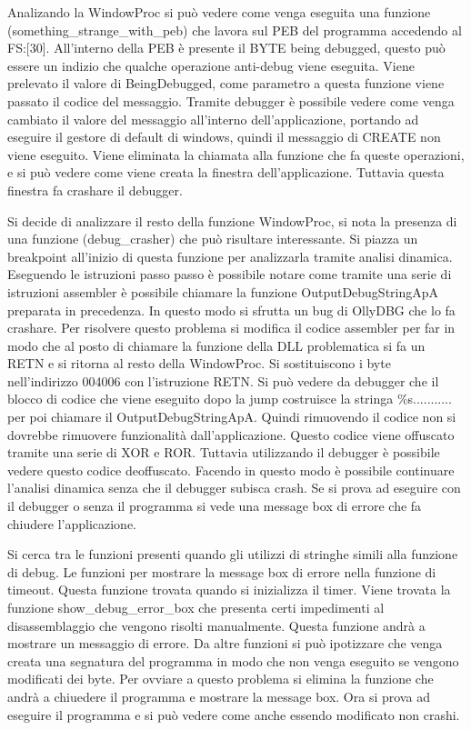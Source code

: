 \documentclass[a4paper,10pt]{article}
\begin{document}
Analizando la WindowProc si può vedere come venga eseguita una funzione (something\_strange\_with\_peb) che lavora sul PEB del programma accedendo al FS:[30]. All'interno della PEB è presente il BYTE being debugged, questo può essere un indizio che qualche operazione anti-debug viene eseguita. Viene prelevato il valore di BeingDebugged, come parametro a questa funzione viene passato il codice del messaggio. Tramite debugger è possibile vedere come venga cambiato il valore del messaggio all'interno dell'applicazione, portando ad eseguire il gestore di default di windows, quindi il messaggio di CREATE non viene eseguito. Viene eliminata la chiamata alla funzione che fa queste operazioni, e si può vedere come viene creata la finestra dell'applicazione. Tuttavia questa finestra fa crashare il debugger.

Si decide di analizzare il resto della funzione WindowProc, si nota la presenza di una funzione (debug\_crasher) che può risultare interessante. Si piazza un breakpoint all'inizio di questa funzione per analizzarla tramite analisi dinamica. Eseguendo le istruzioni passo passo è possibile notare come tramite una serie di istruzioni assembler è possibile chiamare la funzione OutputDebugStringApA preparata in precedenza. In questo modo si sfrutta un bug di OllyDBG che lo fa crashare. Per risolvere questo problema si modifica il codice assembler per far in modo che al posto di chiamare la funzione della DLL problematica si fa un RETN e si ritorna al resto della WindowProc. Si sostituiscono i byte nell'indirizzo 004006 con l'istruzione RETN. Si può vedere da debugger che il blocco di codice che viene eseguito dopo la jump costruisce la stringa \%s........... per poi chiamare il OutputDebugStringApA. Quindi rimuovendo il codice non si dovrebbe rimuovere funzionalità dall'applicazione. Questo codice viene offuscato tramite una serie di XOR  e ROR. Tuttavia utilizzando il debugger è possibile vedere questo codice deoffuscato.
Facendo in questo modo è possibile continuare l'analisi dinamica senza che il debugger subisca crash. Se si prova ad eseguire con il debugger o senza il programma si vede una message box di errore che fa chiudere l'applicazione.

Si cerca tra le funzioni presenti quando gli utilizzi di stringhe simili alla funzione di debug. Le funzioni per mostrare la message box di errore nella funzione di timeout. Questa funzione trovata quando si inizializza il timer.
Viene trovata la funzione show\_debug\_error\_box che presenta certi impedimenti al disassemblaggio che vengono risolti manualmente. Questa funzione andrà a mostrare un messaggio di errore. Da altre funzioni si può ipotizzare che venga creata una segnatura del programma in modo che non venga eseguito se vengono modificati dei byte. Per ovviare a questo problema si elimina la funzione che andrà a chiuedere il programma e mostrare la message box.
Ora si prova ad eseguire il programma e si può vedere come anche essendo modificato non crashi.
\end{document}
